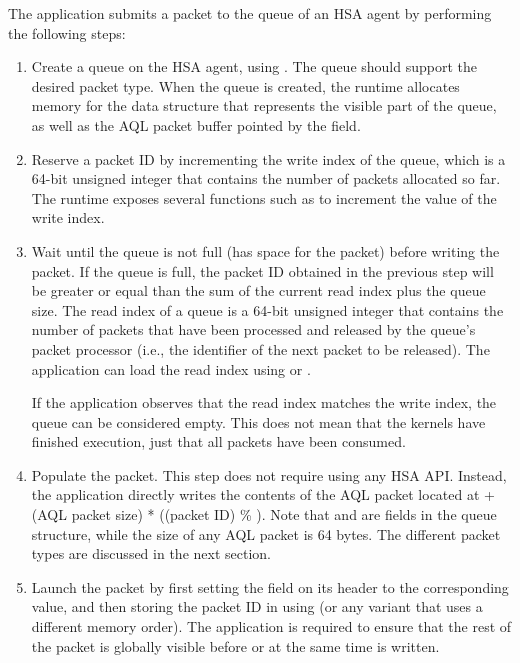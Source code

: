 \documentclass[final,oneside]{book}
\begin{document}
The application submits a packet to the queue of an HSA agent by performing the
following steps:
\begin{enumerate}[itemsep=1pt,topsep=3pt,partopsep=0pt]

\item Create a queue on the HSA agent, using . The queue
  should support the desired packet type. When the queue is created, the runtime
  allocates memory for the  data structure that represents
  the visible part of the queue, as well as the AQL packet buffer pointed by the
   field.

\item Reserve a packet ID by incrementing the write index of the queue, which is
  a 64-bit unsigned integer that contains the number of packets allocated so
  far. The runtime exposes several functions such as
   to increment the value of the write
  index.

\item Wait until the queue is not full (has space for the packet) before writing
the packet. If the queue is full, the packet ID obtained in the previous step
will be greater or equal than the sum of the current read index plus the queue
size. The read index of a queue is a 64-bit unsigned integer that contains the
number of packets that have been processed and released by the queue's packet
processor (i.e., the identifier of the next packet to be released). The
application can load the read index using
 or
.

  If the application observes that the read index matches the write index, the
  queue can be considered empty. This does not mean that the kernels have
  finished execution, just that all packets have been consumed.

\item Populate the packet. This step does not require using any HSA
  API. Instead, the application directly writes the contents of the AQL packet
  located at  + (AQL packet size) * ((packet
  ID) \% ). Note that 
  and  are fields in the queue structure, while the
  size of any AQL packet is 64 bytes. The different packet types are discussed
  in the next section.

\item Launch the packet by first setting the 
field on its header to the corresponding value, and then storing the packet ID
in  using 
(or any variant that uses a different memory order). The application is required
to ensure that the rest of the packet is globally visible before or at the same
time  is written.


\end{enumerate}
\end{document}
